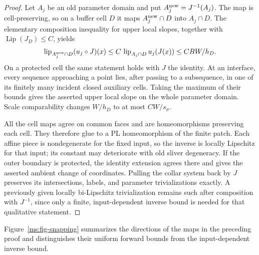 \documentclass[11pt]{article}
\numberwithin{equation}{section}
\theoremstyle{definition}
\theoremstyle{remark}
\DeclareMathOperator{\Lip}{Lip}
\begin{document}
\begin{proof}
Let $A_j$ be an old parameter domain and put
$A_j^{\rm new}=J^{-1}(A_j)$.  The map is cell-preserving, so on a
buffer cell $D$ it maps $A_j^{\rm new}\cap D$ into $A_j\cap D$.
The elementary composition inequality for upper local slopes,
together with $\Lip(J_D)\leq C$, yields
\[
 \operatorname{lip}_{A_j^{\rm new}\cap D}(u_j\circ J)(x)
 \leq C\,\operatorname{lip}_{A_j\cap D}u_j(J(x))
 \leq C B W/h_D.
\]
On a protected cell the same statement holds with $J$ the identity.
At an interface, every sequence approaching a point lies, after
passing to a subsequence, in one of its finitely many incident
closed auxiliary cells.  Taking the maximum of their bounds gives
the asserted upper local slope on the whole parameter domain.
Scale comparability changes $W/h_D$ to at most $C W/s_\sigma$.

All the cell maps agree on common faces and are homeomorphisms
preserving each cell.  They therefore glue to a PL homeomorphism
of the finite patch.  Each affine piece is nondegenerate for the
fixed input, so the inverse is locally Lipschitz for that input;
its constant may deteriorate with old sliver degeneracy.  If the
outer boundary is protected, the identity extension agrees there
and gives the asserted ambient change of coordinates.  Pulling
the collar system back by $J$ preserves its intersections, labels,
and parameter trivializations exactly.  A previously given
locally bi-Lipschitz trivialization remains such after composition
with $J^{-1}$, since only a finite, input-dependent inverse bound
is needed for that qualitative statement.
\end{proof}

Figure~\ref{ms:fig-snapping} summarizes the directions of the maps
in the preceding proof and distinguishes their uniform forward
bounds from the input-dependent inverse bound.
\end{document}
